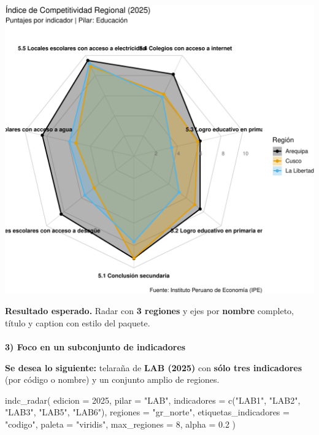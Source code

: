 \documentclass[
  11pt,
  letterpaper,
  DIV=11,
  numbers=noendperiod]{scrartcl}
\makeatletter
\let\oldparagraph\paragraph
\renewcommand{\paragraph}{
    \@ifstar
      \xxxParagraphStar
      \xxxParagraphNoStar
  }
\newcommand{\xxxParagraphStar}[1]{\oldparagraph*{#1}\mbox{}}
\newcommand{\xxxParagraphNoStar}[1]{\oldparagraph{#1}\mbox{}}
\newenvironment{Shaded}{\begin{snugshade}}{\end{snugshade}}
\newcommand{\AttributeTok}[1]{\textcolor[rgb]{0.40,0.45,0.13}{#1}}
\newcommand{\DecValTok}[1]{\textcolor[rgb]{0.68,0.00,0.00}{#1}}
\newcommand{\FloatTok}[1]{\textcolor[rgb]{0.68,0.00,0.00}{#1}}
\newcommand{\FunctionTok}[1]{\textcolor[rgb]{0.28,0.35,0.67}{#1}}
\newcommand{\NormalTok}[1]{\textcolor[rgb]{0.00,0.23,0.31}{#1}}
\newcommand{\StringTok}[1]{\textcolor[rgb]{0.13,0.47,0.30}{#1}}
\makeatother
\begin{document}
\includegraphics{Manual_files/figure-pdf/unnamed-chunk-95-1.pdf}

\textbf{Resultado esperado.} Radar con \textbf{3 regiones} y ejes por
\textbf{nombre} completo, título y caption con estilo del paquete.

\paragraph{\texorpdfstring{\textbf{3) Foco en un subconjunto de
indicadores}}{3) Foco en un subconjunto de indicadores}}\label{foco-en-un-subconjunto-de-indicadores}

\textbf{Se desea lo siguiente:} telaraña de \textbf{LAB (2025)} con
\textbf{sólo tres indicadores} (por código o nombre) y un conjunto
amplio de regiones.

\begin{Shaded}
\begin{Highlighting}[]
\FunctionTok{indc\_radar}\NormalTok{(}
  \AttributeTok{edicion   =} \DecValTok{2025}\NormalTok{,}
  \AttributeTok{pilar     =} \StringTok{"LAB"}\NormalTok{,}
  \AttributeTok{indicadores =} \FunctionTok{c}\NormalTok{(}\StringTok{"LAB1"}\NormalTok{, }\StringTok{"LAB2"}\NormalTok{, }\StringTok{"LAB3"}\NormalTok{, }\StringTok{"LAB5"}\NormalTok{, }\StringTok{"LAB6"}\NormalTok{),}
  \AttributeTok{regiones  =} \StringTok{"gr\_norte"}\NormalTok{,}
  \AttributeTok{etiquetas\_indicadores =} \StringTok{"codigo"}\NormalTok{,}
  \AttributeTok{paleta    =} \StringTok{"viridis"}\NormalTok{,}
  \AttributeTok{max\_regiones =} \DecValTok{8}\NormalTok{,  }
  \AttributeTok{alpha     =} \FloatTok{0.2}
\NormalTok{)}
\end{Highlighting}
\end{Shaded}
\end{document}

